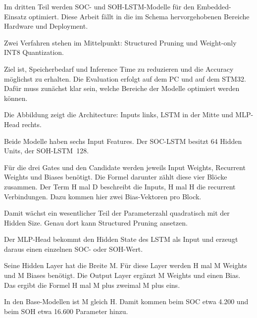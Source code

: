 
\begin{sprechtext}

Im dritten Teil werden SOC- und SOH-LSTM-Modelle für den Embedded-Einsatz optimiert. Diese Arbeit fällt in die im Schema hervorgehobenen Bereiche Hardware und Deployment.

Zwei Verfahren stehen im Mittelpunkt: Structured Pruning und Weight-only INT8 Quantization.

Ziel ist, Speicherbedarf und Inference Time zu reduzieren und die Accuracy möglichst zu erhalten. Die Evaluation erfolgt auf dem PC und auf dem STM32. Dafür muss zunächst klar sein, welche Bereiche der Modelle optimiert werden können.

\end{sprechtext}


\begin{sprechtext}

Die Abbildung zeigt die Architecture: Inputs links, LSTM in der Mitte und MLP-Head rechts.

Beide Modelle haben sechs Input Features. Der SOC-LSTM besitzt 64 Hidden Units, der \mbox{SOH-LSTM~128}.

Für die drei Gates und den Candidate werden jeweils Input Weights, Recurrent Weights und Biases benötigt. Die Formel darunter zählt diese vier Blöcke zusammen. Der Term H mal D beschreibt die Inputs, H mal H die recurrent Verbindungen. Dazu kommen hier zwei Bias-Vektoren pro Block.

Damit wächst ein wesentlicher Teil der Parameterzahl quadratisch mit der Hidden Size. Genau dort kann Structured Pruning ansetzen.

\end{sprechtext}


\begin{sprechtext}

Der MLP-Head bekommt den Hidden State des LSTM als Input und erzeugt daraus einen einzelnen SOC- oder SOH-Wert.

Seine Hidden Layer hat die Breite M. Für diese Layer werden H mal M Weights und M Biases benötigt. Die Output Layer ergänzt M Weights und einen Bias. Das ergibt die Formel H mal M plus zweimal M plus eins.

In den Base-Modellen ist M gleich H. Damit kommen beim SOC etwa 4.200 und beim SOH etwa 16.600 Parameter hinzu.

\end{sprechtext}

